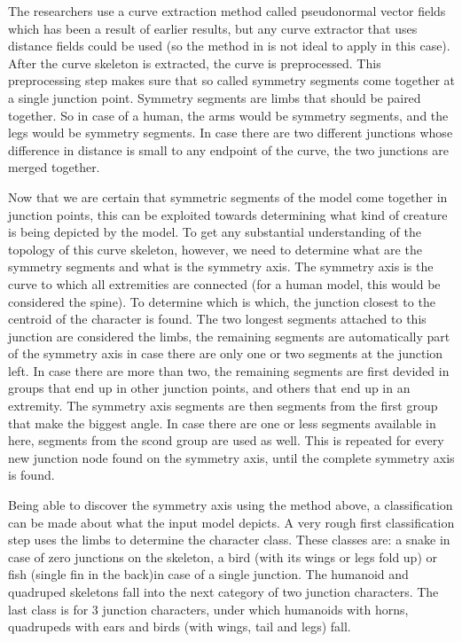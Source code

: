 \documentclass{article}
\begin{document}
The researchers use a curve extraction method called pseudonormal vector fields
which has been a result of earlier results, but any curve extractor that uses
distance fields could be used (so the method in \citep{paper2} is not ideal to
apply in this case). After the curve skeleton is extracted, the
curve is preprocessed. This preprocessing step makes sure that so called
symmetry segments come together at a single junction point. Symmetry segments
are limbs that should be paired together. So in case of a human, the arms would
be symmetry segments, and the legs would be symmetry segments. In case there are
two different junctions whose difference in distance is small to any endpoint of
the curve, the two junctions are merged together.

Now that we are certain that symmetric segments of the model come
together in junction points, this can be exploited towards determining what kind
of creature is being depicted by the model. To get any substantial understanding
of the topology of this curve skeleton, however, we need to determine what are
the symmetry segments and what is the symmetry axis. The symmetry axis is the
curve to which all extremities are connected (for a human model, this would be
considered the spine). To determine which is which, the
junction closest to the centroid of the character is found. The two longest
segments attached to this junction are considered the limbs, the remaining
segments are automatically part of the symmetry axis in case there are only one
or two segments at the junction left. In case there are more than two, the
remaining segments are first devided in groups that end up in other junction
points, and others that end up in an extremity. The symmetry axis segments are
then segments from the first group that make the biggest angle. In case there
are one or less segments available in here, segments from the scond group are
used as well. This is repeated for every new junction node found on the symmetry
axis, until the complete symmetry axis is found.

Being able to discover the symmetry axis using the method above, a
classification can be made about what the input model depicts. A very rough
first classification step uses the limbs to determine the character class. These
classes are:  a snake in case of zero junctions on the skeleton,
a bird (with its wings or legs fold up) or fish (single fin in the back)in case
of a single junction. The humanoid and quadruped skeletons fall into the next
category of two junction characters. The last class is for 3 junction
characters, under which humanoids with horns, quadrupeds with ears and birds
(with wings, tail and legs) fall.
\end{document}
